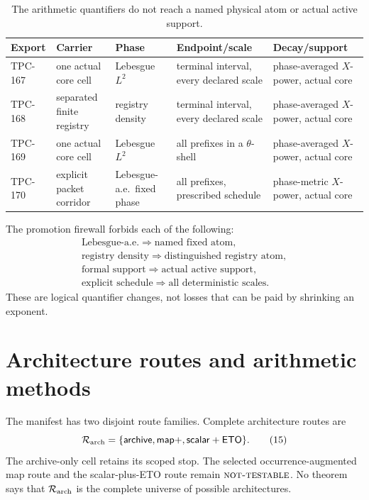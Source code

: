 \documentclass[11pt]{article}
\theoremstyle{definition}
\theoremstyle{remark}
\newcommand{\NT}{\textnormal{\textsc{not-testable}}}
\begin{document}
\begin{table}[ht]
\centering
\small
\begin{tabularx}{\textwidth}{P{0.75in}YYYY}
\toprule
Export & Carrier & Phase & Endpoint/scale & Decay/support\\
\midrule
TPC-167 & one actual core cell & Lebesgue \(L^2\) &
terminal interval, every declared scale &
phase-averaged \(X\)-power, actual core\\
TPC-168 & separated finite registry & registry density &
terminal interval, every declared scale &
phase-averaged \(X\)-power, actual core\\
TPC-169 & one actual core cell & Lebesgue \(L^2\) &
all prefixes in a \(\theta\)-shell &
phase-averaged \(X\)-power, actual core\\
TPC-170 & explicit packet corridor & Lebesgue-a.e.\ fixed phase &
all prefixes, prescribed schedule &
phase-metric \(X\)-power, actual core\\
\bottomrule
\end{tabularx}
\caption{The arithmetic quantifiers do not reach a named physical atom
or actual active support.}
\label{tab:quantifiers}
\end{table}

The promotion firewall forbids each of the following:
\[
\begin{array}{c}
\text{Lebesgue-a.e.}\Longrightarrow\text{named fixed atom},\\
\text{registry density}\Longrightarrow\text{distinguished registry atom},\\
\text{formal support}\Longrightarrow\text{actual active support},\\
\text{explicit schedule}\Longrightarrow\text{all deterministic scales}.
\end{array}
\tag{14}\label{eq:forbidden}
\]
These are logical quantifier changes, not losses that can be paid by
shrinking an exponent.

\section{Architecture routes and arithmetic methods}

The manifest has two disjoint route families.  Complete architecture
routes are
\[
\mathcal R_{\rm arch}
=\{\mathsf{archive},\mathsf{map+},\mathsf{scalar+ETO}\}.
\tag{15}\label{eq:arch}
\]
The archive-only cell retains its scoped stop.  The selected
occurrence-augmented map route and the scalar-plus-ETO route remain
\(\NT\).  No theorem says that \(\mathcal R_{\rm arch}\) is the
complete universe of possible architectures.
\end{document}
